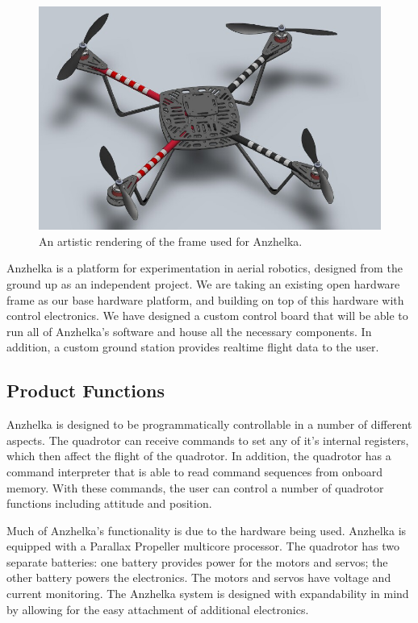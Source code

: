 \documentclass[english]{article}
\numberwithin{equation}{section} %
\begin{document}
\begin{figure}[h!]
  \centering
	\includegraphics[scale=.6]{elev_8_rendering.JPG}
  \caption{An artistic rendering of the frame used for Anzhelka.}
\end{figure}  
Anzhelka is a platform for experimentation in aerial robotics, designed from the ground up as an independent project. We are taking an existing open hardware frame as our base hardware platform, and building on top of this hardware with control electronics. We have designed a custom control board that will be able to run all of Anzhelka's software and house all the necessary components. In addition, a custom ground station provides realtime flight data to the user.\\


\subsection{Product Functions}
Anzhelka is designed to be programmatically controllable in a number of different aspects. The quadrotor can receive commands to set any of it's internal registers, which then affect the flight of the quadrotor. In addition, the quadrotor has a command interpreter that is able to read command sequences from onboard memory. With these commands, the user can control a number of quadrotor functions including attitude and position.

Much of Anzhelka's functionality is due to the hardware being used. Anzhelka is equipped with a Parallax Propeller multicore processor. The quadrotor has two separate batteries: one battery provides power for the motors and servos; the other battery powers the electronics. The motors and servos have voltage and current monitoring. The Anzhelka system is designed with expandability in mind by allowing for the easy attachment of additional electronics.
\end{document}

